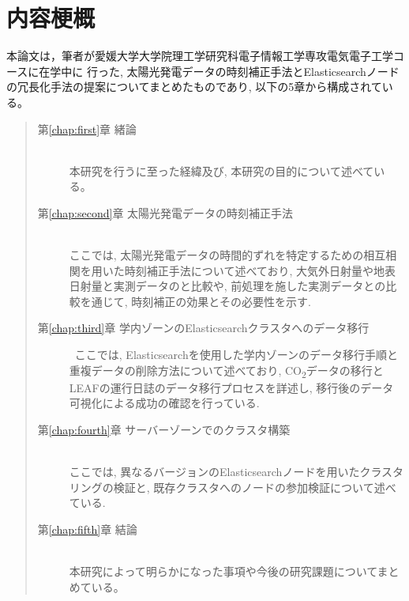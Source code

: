 \chapter*{内容梗概}

本論文は，筆者が愛媛大学大学院理工学研究科電子情報工学専攻電気電子工学コースに在学中に
行った, 太陽光発電データの時刻補正手法とElasticsearchノードの冗長化手法の提案についてまとめたものであり, 以下の5章から構成されている。\\

\begin{quote}
      \begin{description}

            \item[第\ref{chap:first}章 緒論]\ \\
            本研究を行うに至った経緯及び, 本研究の目的について述べている。
            \vspace{3.0mm}
            
            \item[第\ref{chap:second}章 太陽光発電データの時刻補正手法]\ \\
            ここでは, 太陽光発電データの時間的ずれを特定するための相互相関を用いた時刻補正手法について述べており, 大気外日射量や地表日射量と実測データのと比較や, 前処理を施した実測データとの比較を通じて, 時刻補正の効果とその必要性を示す. 
            \vspace{3.0mm}
            
            \item[第\ref{chap:third}章 学内ゾーンのElasticsearchクラスタへのデータ移行]\
            ここでは, Elasticsearchを使用した学内ゾーンのデータ移行手順と重複データの削除方法について述べており, CO\textsubscript{2}データの移行とLEAFの運行日誌のデータ移行プロセスを詳述し, 移行後のデータ可視化による成功の確認を行っている.
            \vspace{3.0mm}
            
            \item[第\ref{chap:fourth}章 サーバーゾーンでのクラスタ構築]\ \\
            ここでは, 異なるバージョンのElasticsearchノードを用いたクラスタリングの検証と, 既存クラスタへのノードの参加検証について述べている.
            \vspace{3.0mm}
            
            \item[第\ref{chap:fifth}章 結論]\ \\
            本研究によって明らかになった事項や今後の研究課題についてまとめている。
      \end{description}
\end{quote}
